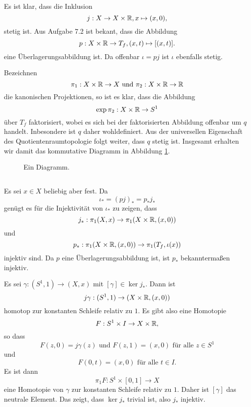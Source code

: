 \documentclass[a4paper,10pt]{article}
\begin{document}
\section{}
Es ist klar, dass die Inklusion
\[
 j : X \to X \times \mathbb{R}, x \mapsto (x,0),
\]
stetig ist. Aus Aufgabe 7.2 ist bekant, dass die Abbildung
\[
 p : X \times \mathbb{R} \to T_f, (x,t) \mapsto [(x,t)].
\]
eine Überlagerungsabbildung ist. Da offenbar $\iota = pj$ ist $\iota$ ebenfalls stetig.

Bezeichnen
\[
 \pi_1 : X \times \mathbb{R} \to X \text{ und } \pi_2 : X \times \mathbb{R} \to \mathbb{R}
\]
die kanonischen Projektionen, so ist es klar, dass die Abbildung
\[
 \exp \pi_2 : X \times \mathbb{R} \to S^1
\]
über $T_f$ faktorisiert, wobei es sich bei der faktorisierten Abbildung offenbar um $q$ handelt. Inbesondere ist $q$ daher wohldefiniert. Aus der universellen Eigenschaft des Quotientenraumtopologie folgt weiter, dass $q$ stetig ist. Insgesamt erhalten wir damit das kommutative Diagramm in Abbildung \ref{fig: großes Diagramm}.
\begin{figure}\centering
 \caption{Ein Diagramm.}
 \label{fig: großes Diagramm}
\end{figure}


\subsection{}
Es sei $x \in X$ beliebig aber fest. Da
\[
 \iota_* = (pj)_* = p_* j_*
\]
genügt es für die Injektivität von $\iota_*$ zu zeigen, dass
\[
 j_* : \pi_1(X,x) \to \pi_1(X \times \mathbb{R}, (x,0))
\]
und
\[
 p_* : \pi_1(X \times \mathbb{R}, (x,0)) \to \pi_1(T_f, \iota(x))
\]
injektiv sind. Da $p$ eine Überlagerungsabbildung ist, ist $p_*$ bekanntermaßen injektiv.

Es sei $\gamma : (S^1,1) \to (X,x)$ mit $[\gamma] \in \ker j_*$. Dann ist
\[
 j \gamma : (S^1,1) \to (X \times \mathbb{R}, (x,0))
\]
homotop zur konstanten Schleife relativ zu $1$. Es gibt also eine Homotopie
\[
 F : S^1 \times I \to X \times \mathbb{R},
\]
so dass
\[
 F(z,0) = j\gamma(z) \text{ und } F(z,1) = (x,0) \text{ für alle } z \in S^1
\]
und
\[
 F(0,t) = (x,0) \text{ für alle } t \in I.
\]
Es ist dann
\[
 \pi_1 F : S^1 \times [0,1] \to X
\]
eine Homotopie von $\gamma$ zur konstanten Schleife relativ zu $1$. Daher ist $[\gamma]$ das neutrale Element. Das zeigt, dass $\ker j_*$ trivial ist, also $j_*$ injektiv.
\end{document}
